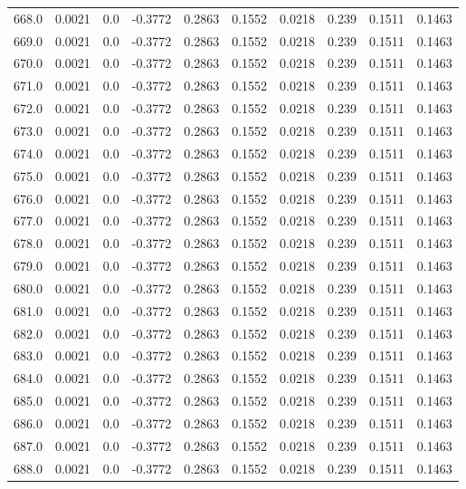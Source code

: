 \begin{longtable}{lrrrrrrrrr}
668.0 & 0.0021 & 0.0 & -0.3772 & 0.2863 & 0.1552 & 0.0218 & 0.239 & 0.1511 & 0.1463 \\
669.0 & 0.0021 & 0.0 & -0.3772 & 0.2863 & 0.1552 & 0.0218 & 0.239 & 0.1511 & 0.1463 \\
670.0 & 0.0021 & 0.0 & -0.3772 & 0.2863 & 0.1552 & 0.0218 & 0.239 & 0.1511 & 0.1463 \\
671.0 & 0.0021 & 0.0 & -0.3772 & 0.2863 & 0.1552 & 0.0218 & 0.239 & 0.1511 & 0.1463 \\
672.0 & 0.0021 & 0.0 & -0.3772 & 0.2863 & 0.1552 & 0.0218 & 0.239 & 0.1511 & 0.1463 \\
673.0 & 0.0021 & 0.0 & -0.3772 & 0.2863 & 0.1552 & 0.0218 & 0.239 & 0.1511 & 0.1463 \\
674.0 & 0.0021 & 0.0 & -0.3772 & 0.2863 & 0.1552 & 0.0218 & 0.239 & 0.1511 & 0.1463 \\
675.0 & 0.0021 & 0.0 & -0.3772 & 0.2863 & 0.1552 & 0.0218 & 0.239 & 0.1511 & 0.1463 \\
676.0 & 0.0021 & 0.0 & -0.3772 & 0.2863 & 0.1552 & 0.0218 & 0.239 & 0.1511 & 0.1463 \\
677.0 & 0.0021 & 0.0 & -0.3772 & 0.2863 & 0.1552 & 0.0218 & 0.239 & 0.1511 & 0.1463 \\
678.0 & 0.0021 & 0.0 & -0.3772 & 0.2863 & 0.1552 & 0.0218 & 0.239 & 0.1511 & 0.1463 \\
679.0 & 0.0021 & 0.0 & -0.3772 & 0.2863 & 0.1552 & 0.0218 & 0.239 & 0.1511 & 0.1463 \\
680.0 & 0.0021 & 0.0 & -0.3772 & 0.2863 & 0.1552 & 0.0218 & 0.239 & 0.1511 & 0.1463 \\
681.0 & 0.0021 & 0.0 & -0.3772 & 0.2863 & 0.1552 & 0.0218 & 0.239 & 0.1511 & 0.1463 \\
682.0 & 0.0021 & 0.0 & -0.3772 & 0.2863 & 0.1552 & 0.0218 & 0.239 & 0.1511 & 0.1463 \\
683.0 & 0.0021 & 0.0 & -0.3772 & 0.2863 & 0.1552 & 0.0218 & 0.239 & 0.1511 & 0.1463 \\
684.0 & 0.0021 & 0.0 & -0.3772 & 0.2863 & 0.1552 & 0.0218 & 0.239 & 0.1511 & 0.1463 \\
685.0 & 0.0021 & 0.0 & -0.3772 & 0.2863 & 0.1552 & 0.0218 & 0.239 & 0.1511 & 0.1463 \\
686.0 & 0.0021 & 0.0 & -0.3772 & 0.2863 & 0.1552 & 0.0218 & 0.239 & 0.1511 & 0.1463 \\
687.0 & 0.0021 & 0.0 & -0.3772 & 0.2863 & 0.1552 & 0.0218 & 0.239 & 0.1511 & 0.1463 \\
688.0 & 0.0021 & 0.0 & -0.3772 & 0.2863 & 0.1552 & 0.0218 & 0.239 & 0.1511 & 0.1463 \\

\end{longtable}
